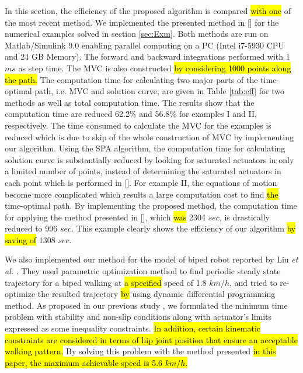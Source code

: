 \documentclass{rob}%
\begin{document}
In this section, the efficiency of the proposed algorithm is compared \hl{with one} of the most recent method. We implemented the presented method in [] for the numerical examples solved in section \ref{sec:Exm}. Both methods are run on Matlab/Simulink 9.0 enabling parallel computing on a PC (Intel i7-5930 CPU and 24 GB Memory). The forward and backward integrations performed with 1 $ ms $ as step time. The MVC is also constructed \hl{by considering 1000 points along the path.} The computation time for calculating two major parts of the time-optimal path, i.e. MVC and solution curve, are given in Table \ref{tab:eff} for two methods as well as total computation time. The results show that the computation time are reduced 62.2\% and 56.8\% for examples I and II, respectively. The time consumed to calculate the MVC for the examples is reduced which is due to skip of the whole construction of MVC by implementing our algorithm. 
Using the SPA algorithm, the computation time for calculating solution curve is substantially reduced by looking for saturated actuators in only a limited number of points, instead of determining the saturated actuators in each point which is performed in [].
For example II, the equations of motion become more complicated which results a large computation cost to find \hl{the} time-optimal path. By implementing the proposed method, the
computation time for applying the method presented in [], which \hl{was} 2304 $ sec $,  is drastically reduced to 996 $ sec $. This example clearly shows the efficiency of our algorithm \hl{by saving of} 1308 $ sec $.

We also implemented our method for the model of biped robot reported  by  Liu \textit{et al.} \cite{Liu2013}. They used parametric optimization method to find periodic steady state trajectory  for a biped walking at \hl{a specified} speed of 1.8 $ km/h $, and tried to re-optimize the resulted trajectory \hl{by} using dynamic differential programming method. As proposed in our previous study \cite{Sadigh2013},  we formulated the minimum time problem with stability and non-slip conditions along with actuator's limits expressed as some inequality constraints. \hl{In addition, certain kinematic constraints are considered in terms of hip joint position that ensure an acceptable walking pattern.} By solving this problem with the method presented \hl{in this paper, the maximum achievable speed is 5.6 $ km/h $.}
\end{document}
